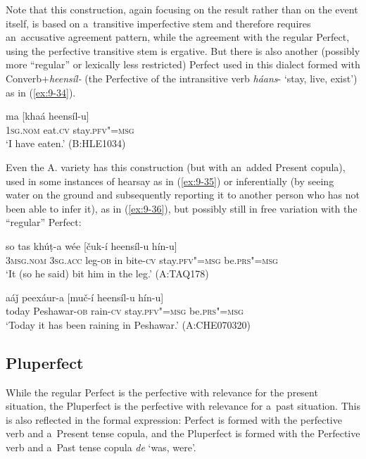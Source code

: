 Note that this construction, again focusing on the result rather than on the event itself, is based on a~transitive imperfective stem and therefore requires an~accusative agreement pattern, while the agreement with the regular Perfect, using the perfective transitive stem is ergative. But there is also another (possibly more ``regular'' or lexically less restricted) Perfect used in this dialect formed with Converb+\textit{heensíl-} (the Perfective of the intransitive verb \textit{háans}- `stay, live, exist') as in (\ref{ex:9-34}).

\begin{exe}
\ex
\label{ex:9-34}
\gll ma [khaá heensíl-u]  \\
\textsc{1sg.nom} eat.\textsc{cv} stay.\textsc{pfv"=msg} \\
\glt `I have eaten.' (B:HLE1034)
\end{exe}

Even the A. variety has this construction (but with an~added Present copula), used in some instances of hearsay as in (\ref{ex:9-35}) or inferentially (by seeing water on the ground and subsequently reporting it to another person who has not been able to infer it), as in (\ref{ex:9-36}), but possibly still in free variation with the ``regular'' Perfect:

\begin{exe}
\ex
\label{ex:9-35}
\gll so tas khúṭ-a wée [čuk-í heensíl-u hín-u] \\
\textsc{3msg.nom} \textsc{3sg.acc} leg-\textsc{ob} in bite-\textsc{cv} stay.\textsc{pfv"=msg} be.\textsc{prs"=msg} \\
\glt `It (so he said) bit him in the leg.' (A:TAQ178)

\ex
\label{ex:9-36}
\gll aáǰ peexáur-a [muč-í heensíl-u hín-u]  \\
today Peshawar-\textsc{ob} rain-\textsc{cv} stay.\textsc{pfv"=msg} be.\textsc{prs"=msg} \\
\glt `Today it has been raining in Peshawar.' (A:CHE070320)
\end{exe}

\subsection{Pluperfect}
\label{subsec:9-1-8}

While the regular Perfect is the perfective with relevance for the present situation, the Pluperfect is the perfective with relevance for a~past situation. This is also reflected in the formal expression: Perfect is formed with the perfective verb and a~Present tense copula, and the Pluperfect is formed with the Perfective verb and a~Past tense copula \textit{de} `was, were'. 


